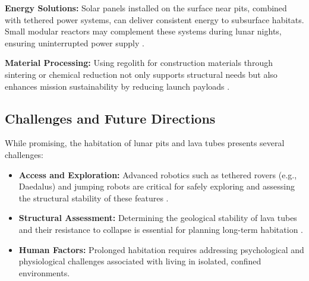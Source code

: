 \textbf{Energy Solutions:}
Solar panels installed on the surface near pits, combined with tethered power systems, can deliver consistent energy to subsurface habitats. Small modular reactors may complement these systems during lunar nights, ensuring uninterrupted power supply \cite{lro}.

\textbf{Material Processing:}
Using regolith for construction materials through sintering or chemical reduction not only supports structural needs but also enhances mission sustainability by reducing launch payloads \cite{jsanders-isru}.

\subsection{Challenges and Future Directions}

While promising, the habitation of lunar pits and lava tubes presents several challenges:
\begin{itemize}
    \item \textbf{Access and Exploration:} Advanced robotics such as tethered rovers (e.g., Daedalus) and jumping robots are critical for safely exploring and assessing the structural stability of these features \cite{esa-daedalus}.
    \item \textbf{Structural Assessment:} Determining the geological stability of lava tubes and their resistance to collapse is essential for planning long-term habitation \cite{sublunear-lava}.
    \item \textbf{Human Factors:} Prolonged habitation requires addressing psychological and physiological challenges associated with living in isolated, confined environments.
\end{itemize}
